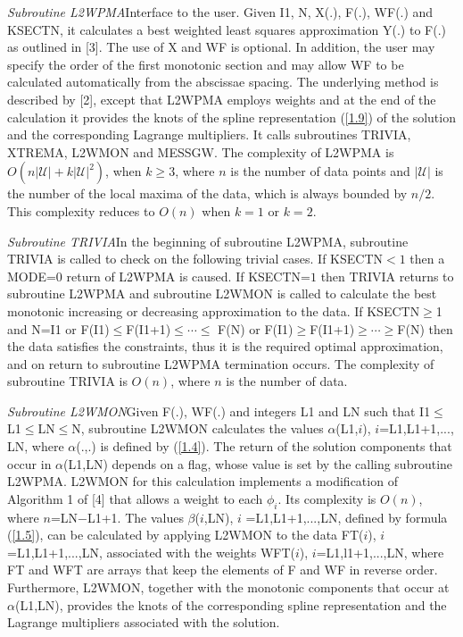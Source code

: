 \documentclass[acmtoms]{acmtrans2m}
\begin{document}
\textit{Subroutine L2WPMA\qquad }Interface to the user. Given I1, N, X(.),
F(.), WF(.) and KSECTN, it calculates a best weighted least squares
approximation Y(.) to F(.) as outlined in [3]. The use of X and WF is
optional. In addition, the user may specify the order of the first monotonic
section and may allow WF to be calculated automatically from the abscissae
spacing. The underlying method is described by [2], except that L2WPMA
employs weights and at the end of the calculation it provides the knots of
the spline representation (\ref{1.9}) of the solution and the corresponding
Lagrange multipliers. It calls subroutines TRIVIA, XTREMA, L2WMON and
MESSGW. The complexity of L2WPMA is $O(n|\mathscr{U}|+k|\mathscr{U}|^{2})$,
when $k\geq 3$, where $n$ is the number of data points and $|\mathscr{U}|$
is the number of the local maxima of the data, which is always bounded by $%
n/2$. This complexity reduces to $O(n)$ when $k=1$ or $k=2$.

\textit{Subroutine TRIVIA\qquad }In the beginning of subroutine L2WPMA,
subroutine TRIVIA is called to check on the following trivial cases. If
KSECTN$<1$ then a MODE=0 return of L2WPMA is caused. If KSECTN=$1$ then
TRIVIA returns to subroutine L2WPMA and subroutine L2WMON is called to
calculate the best monotonic increasing or decreasing approximation to the
data. If KSECTN$\geq $1 and N=I1 or F(I1)$\leq $F(I1+1)$\leq \cdots \leq $%
F(N) or F(I1)$\geq $F(I1+1)$\geq \cdots \geq $F(N) then the data satisfies
the constraints, thus it is the required optimal approximation, and on
return to subroutine L2WPMA termination occurs. The complexity of subroutine
TRIVIA is $O(n)$, where $n$ is the number of data.

\textit{Subroutine L2WMON\qquad }Given F(.), WF(.) and integers L1 and LN
such that I1$\leq $L1$\leq $LN$\leq $N, subroutine L2WMON calculates the
values $\alpha $(L1,$i$), $i$=L1,L1+1,..., LN, where $\alpha $(.,.) is
defined by (\ref{1.4}). The return of the solution components that occur in $%
\alpha $(L1,LN) depends on a flag, whose value is set by the calling
subroutine L2WPMA. L2WMON for this calculation implements a modification of
Algorithm 1 of [4] that allows a weight to each $\phi _{i}$. Its complexity
is $O(n)$, where $n$=LN$-$L1+1. The values $\beta $($i$,LN), $i$%
=L1,L1+1,...,LN, defined by formula (\ref{1.5}), can be calculated by
applying L2WMON to the data FT($i$), $i$=L1,L1+1,...,LN, associated with the
weights WFT($i$), $i$=L1,l1+1,...,LN, where FT and WFT are arrays that keep
the elements of F and WF in reverse order. Furthermore, L2WMON, together
with the monotonic components that occur at $\alpha $(L1,LN), provides the
knots of the corresponding spline representation and the Lagrange
multipliers associated with the solution.
\end{document}
